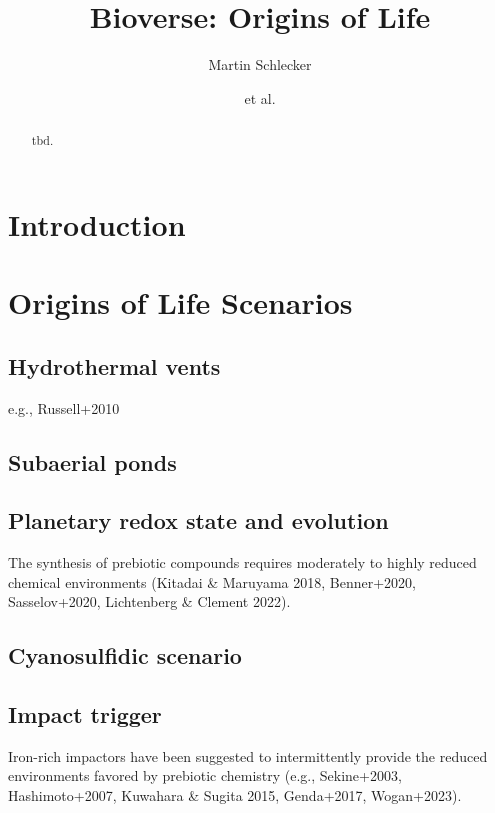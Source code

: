 \documentclass[twocolumn]{aastex631}
\begin{document}
\title{Bioverse: Origins of Life}

\author{Martin Schlecker}
\author{et al.}

\begin{abstract}
    tbd.
\end{abstract}

\section{Introduction}
\label{sec:intro}

\section{Origins of Life Scenarios}
\label{sec:ool_scenarios}

\subsection{Hydrothermal vents}
e.g., Russell+2010

\subsection{Subaerial ponds}

\subsection{Planetary redox state and evolution}
The synthesis of prebiotic compounds requires moderately to highly reduced chemical environments (Kitadai \& Maruyama 2018, Benner+2020, Sasselov+2020, Lichtenberg \& Clement 2022).

\subsection{Cyanosulfidic scenario}

\subsection{Impact trigger}
Iron-rich impactors have been suggested to intermittently provide the reduced environments favored by prebiotic chemistry (e.g., Sekine+2003, Hashimoto+2007, Kuwahara \& Sugita 2015, Genda+2017, Wogan+2023).
\end{document}
